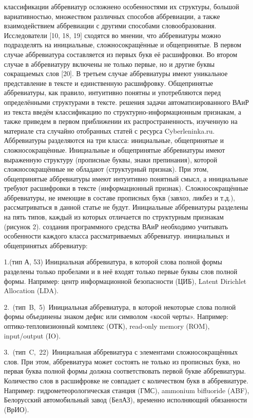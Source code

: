\documentclass[a4paper]{article}
\begin{document}
 классификации аббревиатур осложнено особенностями их структуры, большой вариативностью, множеством различных способов аббревиации, а также взаимодействием аббревиации с другими способами словообразования. Исследователи [10, 18, 19] сходятся во мнении, что аббревиатуры можно подразделять на инициальные, сложносокращённые и общепринятые. В первом случае аббревиатура составляется из первых букв её расшифровки. Во втором случае в аббревиатуру включены не только первые, но и другие буквы сокращаемых слов [20]. В третьем случае аббревиатуры имеют уникальное представление в тексте и единственную расшифровку. Общепринятые аббревиатуры, как правило, интуитивно понятны и употребляются перед определёнными структурами в тексте.
 решения задачи автоматизированного ВАиР из текста введём классификацию по структурно-информационным признакам, а также приведем в первом приближении их распространенность, изученную на материале ста случайно отобранных статей с ресурса Cyberleninka.ru. Аббревиатуры разделяются на три класса: инициальные, общепринятые и сложносокращённые. Инициальные и общепринятые аббревиатуры имеют выраженную структуру (прописные буквы, знаки препинания), которой сложносокращённые не обладают (структурный признак). При этом, общепринятые аббревиатуры имеют интуитивно понятный смысл, а инициальные требуют расшифровки в тексте (информационный признак). Сложносокращённые аббревиатуры, не имеющие в составе прописных букв (завхоз, ликбез и т.д.), рассматриваться в данной статье не будут. Инициальные аббревиатуры разделены на пять типов, каждый из которых отличается по структурным признакам (рисунок 2).
 создания программного средства ВАиР необходимо учитывать особенности каждого класса рассматриваемых аббревиатур. 
 инициальных и общепринятых аббревиатур:
\par1.(тип А, 53) Инициальная аббревиатура, в которой слова полной формы разделены только пробелами и в неё входят только первые буквы слов полной формы. Например: центр информационной безопасности (ЦИБ), Latent Dirichlet Allocation (LDA).
\par2. (тип B, 5) Инициальная аббревиатура, в которой некоторые слова полной формы объединены знаком дефис или символом «косой черты». Например: оптико-тепловизионный комплекс (ОТК), read-only memory (ROM), input/output (IO).
\par3. (тип C, 22) Инициальная аббревиатура с элементами сложносокращённых слов. При этом, аббревиатура может состоять не только из прописных букв, но первая буква полной формы должна соответствовать первой букве аббревиатуры. Количество слов в расшифровке не совпадает с количеством букв в аббревиатуре. Например: гидрометеорологическая станция (ГМС), ammonium bifluoride (ABF), Белорусский автомобильный завод (БелАЗ), временно исполняющий обязанности (ВрИО).
\end{document}
